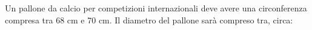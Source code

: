 Un pallone da calcio per competizioni internazionali 
deve avere una circonferenza compresa 
tra 68 cm e 70 cm. 
Il diametro del pallone sarà compreso tra, circa:
